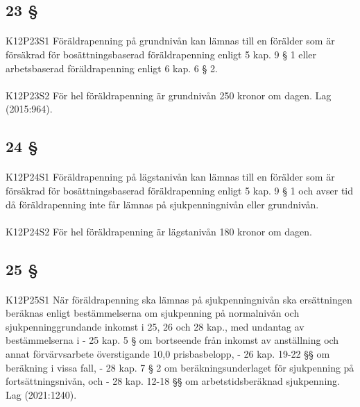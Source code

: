 \documentclass[a4paper,notitlepage,openany,10pt]{book}
\begin{document}
\subsection*{23 §}
\paragraph*{}
{\tiny K12P23S1}
Föräldrapenning på grundnivån kan lämnas till en förälder som är försäkrad för bosättningsbaserad föräldrapenning enligt 5 kap. 9 § 1 eller arbetsbaserad föräldrapenning enligt 6 kap. 6 § 2.
\paragraph*{}
{\tiny K12P23S2}
För hel föräldrapenning är grundnivån 250 kronor om dagen.
Lag (2015:964).
\subsection*{24 §}
\paragraph*{}
{\tiny K12P24S1}
Föräldrapenning på lägstanivån kan lämnas till en förälder som är försäkrad för bosättningsbaserad föräldrapenning enligt 5 kap. 9 § 1 och avser tid då föräldrapenning inte får lämnas på sjukpenningnivån eller grundnivån.
\paragraph*{}
{\tiny K12P24S2}
För hel föräldrapenning är lägstanivån 180 kronor om dagen.
\subsection*{25 §}
\paragraph*{}
{\tiny K12P25S1}
När föräldrapenning ska lämnas på sjukpenningnivån ska ersättningen beräknas enligt bestämmelserna om sjukpenning på normalnivån och sjukpenninggrundande inkomst i 25, 26 och 28 kap., med undantag av bestämmelserna i
\newline - 25 kap. 5 § om bortseende från inkomst av anställning och annat förvärvsarbete överstigande 10,0 prisbasbelopp,
\newline - 26 kap. 19-22 §§ om beräkning i vissa fall,
\newline - 28 kap. 7 § 2 om beräkningsunderlaget för sjukpenning på fortsättningsnivån, och
\newline - 28 kap. 12-18 §§ om arbetstidsberäknad sjukpenning.
Lag (2021:1240).
\end{document}
